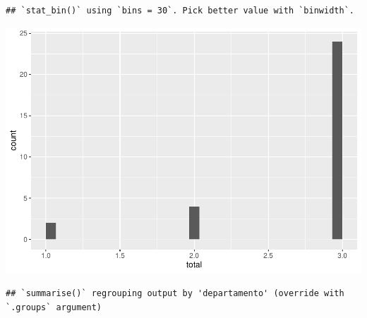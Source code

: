 \documentclass[
  11pt,
]{article}
\newenvironment{Shaded}{\begin{snugshade}}{\end{snugshade}}
\newcommand{\DataTypeTok}[1]{\textcolor[rgb]{0.13,0.29,0.53}{#1}}
\newcommand{\DecValTok}[1]{\textcolor[rgb]{0.00,0.00,0.81}{#1}}
\newcommand{\KeywordTok}[1]{\textcolor[rgb]{0.13,0.29,0.53}{\textbf{#1}}}
\newcommand{\NormalTok}[1]{#1}
\newcommand{\OperatorTok}[1]{\textcolor[rgb]{0.81,0.36,0.00}{\textbf{#1}}}
\newcommand{\StringTok}[1]{\textcolor[rgb]{0.31,0.60,0.02}{#1}}
\begin{document}
\begin{verbatim}
## `stat_bin()` using `bins = 30`. Pick better value with `binwidth`.
\end{verbatim}

\includegraphics{index_files/figure-latex/unnamed-chunk-5-1.pdf}

\begin{Shaded}
\end{Shaded}

\begin{verbatim}
## `summarise()` regrouping output by 'departamento' (override with `.groups` argument)
\end{verbatim}
\end{document}
